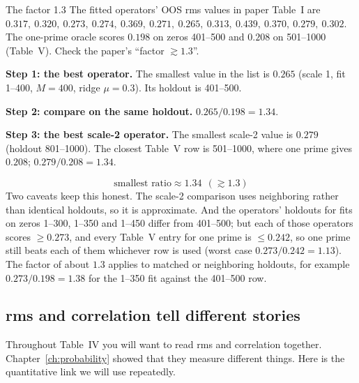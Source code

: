 \begin{sample}{The factor 1.3}
The fitted operators' OOS rms values in paper Table~I are $0.317,\ 0.320,\ 0.273,\ 0.274,\ 0.369,\ 0.271,\ 0.265,\ 0.313,\ 0.439,\ 0.370,\ 0.279,\ 0.302$. The one-prime oracle scores $0.198$ on zeros 401--500 and $0.208$ on 501--1000 (Table~V). Check the paper's ``factor $\gtrsim1.3$''.

\textbf{Step 1: the best operator.} The smallest value in the list is $0.265$ (scale 1, fit 1--400, $M=400$, ridge $\mu=0.3$). Its holdout is 401--500.

\textbf{Step 2: compare on the same holdout.} $0.265/0.198 = 1.34$.

\textbf{Step 3: the best scale-2 operator.} The smallest scale-2 value is $0.279$ (holdout 801--1000). The closest Table~V row is 501--1000, where one prime gives $0.208$; $0.279/0.208=1.34$.

\[
\boxed{\text{smallest ratio}\approx1.34\ \ (\gtrsim1.3)}
\]
Two caveats keep this honest. The scale-2 comparison uses neighboring rather than identical holdouts, so it is approximate. And the operators' holdouts for fits on zeros 1--300, 1--350 and 1--450 differ from 401--500; but each of those operators scores $\ge0.273$, and every Table~V entry for one prime is $\le0.242$, so one prime still beats each of them whichever row is used (worst case $0.273/0.242=1.13$). The factor of about $1.3$ applies to matched or neighboring holdouts, for example $0.273/0.198=1.38$ for the 1--350 fit against the 401--500 row.
\end{sample}

\subsection{rms and correlation tell different stories}

Throughout Table~IV you will want to read rms and correlation together. Chapter~\ref{ch:probability} showed that they measure different things. Here is the quantitative link we will use repeatedly.

